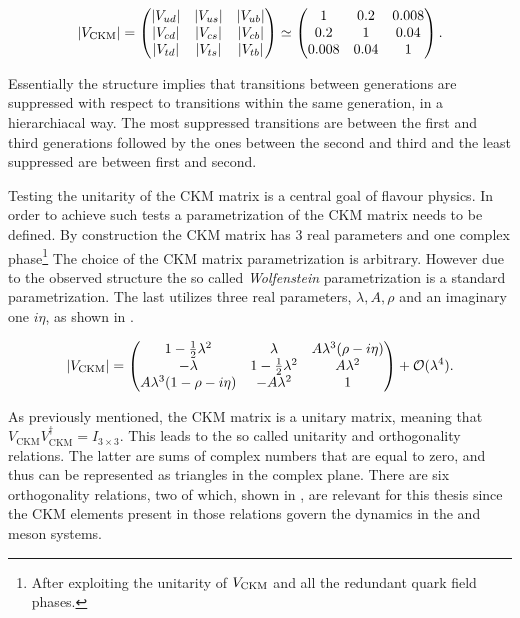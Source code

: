 \begin{equation}
  |V_{\text{CKM}}|
                   = \begin{pmatrix} |V_{ud}| & |V_{us}| & |V_{ub}| \\ |V_{cd}| & |V_{cs}| & |V_{cb}| \\ |V_{td}| & |V_{ts}| & |V_{tb}| \end{pmatrix}
              \simeq \begin{pmatrix} 1 & 0.2 & 0.008 \\ 0.2 & 1 & 0.04 \\ 0.008 & 0.04 & 1 \end{pmatrix}.
      \label{CKMmatrix}
  \end{equation}

\noindent Essentially the structure implies that transitions between generations
are suppressed with respect to transitions within the same generation, in a hierarchiacal way. The most suppressed transitions are between
the first and third generations followed by the ones between the second and third and the least suppressed are between first and second.

Testing the unitarity of the CKM matrix is a central goal of flavour physics. In order to achieve such tests a
parametrization of the CKM matrix needs to be defined. By construction the CKM matrix has
3 real parameters and one complex phase\footnote{After exploiting the unitarity of $V_{\rm CKM}$ and all the redundant quark field phases.}
The choice of the CKM matrix parametrization is \aprior arbitrary. However due to the observed structure the so called
{\it Wolfenstein}\cite{Wolfenstein:1983yz,Buras-wolfenstein} parametrization is a standard parametrization. The last
utilizes three real parameters, $\lambda,A,\rho$ and an imaginary one $i\eta$, as shown in .

\begin{equation}
\centering
  |V_{\text{CKM}}|
                   = \begin{pmatrix} \VudWolf & \VusWolf & \VubWolf \\
                                     \VcdWolf & \VcsWolf & \VcbWolf \\
                                     \VtdWolf & \VtsWolf & \VtbWolf \end{pmatrix} + \mathcal{O}(\lambda^4).
      \label{CKMwolfenstein}
\end{equation}

\noindent As previously mentioned, the CKM matrix is a unitary matrix, meaning that $V_{\text{CKM}} V_{\text{CKM}}^\dagger = I_{3\times3}$.
This leads to the so called unitarity and orthogonality relations. The latter are sums of complex numbers that are equal to zero,
and thus can be represented as triangles in the complex plane. There are six orthogonality relations, two of which, shown
in , are relevant for this thesis since the CKM elements present in those relations govern the
dynamics in the \Bs and \Bd meson systems.

